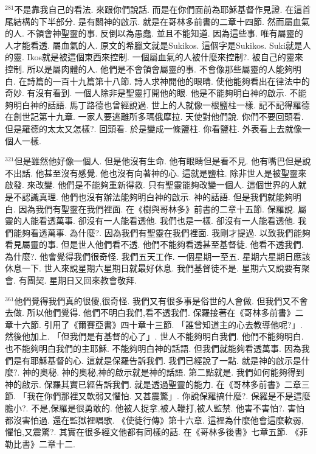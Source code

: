 \documentclass{book}
\begin{document}
$^{281}$不是靠我自己的看法.
來跟你們說話.
而是在你們面前為耶穌基督作見證.
在這首尾結構的下半部分.
是有關神的啟示.
就是在哥林多前書的二章十四節.
然而屬血氣的人.
不領會神聖靈的事.
反倒以為愚蠢.
並且不能知道.
因為這些事.
唯有屬靈的人才能看透.
屬血氣的人.
原文的希臘文就是Sukikos.
這個字是Sukikos.
Suki就是人的靈.
Ikos就是被這個東西來控制.
一個屬血氣的人被什麼來控制?.
被自己的靈來控制.
所以是屬肉體的人.
他們是不會領會屬靈的事.
不會像那些屬靈的人能夠明白.
在詩篇的一百十九篇第十八節.
詩人求神開他的眼睛.
使他能夠看出在律法中的奇妙.
有沒有看到.
一個人除非是聖靈打開他的眼.
他是不能夠明白神的啟示.
不能夠明白神的話語.
馬丁路德也曾經說過.
世上的人就像一根鹽柱一樣.
記不記得羅德在創世記第十九章.
一家人要逃離所多瑪俄摩拉.
天使對他們說.
你們不要回頭看.
但是羅德的太太又怎樣?.
回頭看.
於是變成一條鹽柱.
你看鹽柱.
外表看上去就像一個人一樣.

$^{321}$但是雖然他好像一個人.
但是他沒有生命.
他有眼睛但是看不見.
他有嘴巴但是說不出話.
他甚至沒有感覺.
他也沒有向著神的心.
這就是鹽柱.
除非世人是被聖靈來啟發.
來改變.
他們是不能夠重新得救.
只有聖靈能夠改變一個人.
這個世界的人就是不認識真理.
他們也沒有辦法能夠明白神的啟示.
神的話語.
但是我們就能夠明白.
因為我們有聖靈在我們裡面.
在《樹與哥林多》前書的二章十五節.
保羅說.
屬靈的人能看透萬事.
卻沒有一人能看透他.
我們也是一樣.
卻沒有一人能看透他.
我們能夠看透萬事.
為什麼?.
因為我們有聖靈在我們裡面.
我剛才提過.
以致我們能夠看見屬靈的事.
但是世人他們看不透.
他們不能夠看透甚至基督徒.
他看不透我們.
為什麼?.
他會覺得我們很奇怪.
我們五天工作.
一個星期一至五.
星期六星期日應該休息一下.
世人來說星期六星期日就最好休息.
我們基督徒不是.
星期六又說要有聚會.
有團契.
星期日又回來教會敬拜.

$^{361}$他們覺得我們真的很傻,很奇怪.
我們又有很多事是俗世的人會做.
但我們又不會去做.
所以他們覺得.
他們不明白我們,看不透我們.
保羅接著在《哥林多前書》二章十六節.
引用了《爾賽亞書》四十章十三節.
「誰曾知道主的心去教導他呢?」.
然後他加上.
「但我們是有基督的心了」.
世人不能夠明白我們.
他們不能夠明白.
也不能夠明白我們的主耶穌.
不能夠明白神的話語.
但我們就能夠看透萬事.
因為我們是有耶穌基督的心.
這就是保羅告訴我們.
我們已經說了一點.
就是神的啟示是什麼?.
神的奧秘.
神的奧秘,神的啟示就是神的話語.
第二點就是.
我們如何能夠得到神的啟示.
保羅其實已經告訴我們.
就是透過聖靈的能力.
在《哥林多前書》二章三節.
「我在你們那裡又軟弱又懼怕.
又甚震驚」.
你說保羅搞什麼?.
保羅是不是這麼膽小?.
不是,保羅是很勇敢的.
他被人捉拿,被人鞭打,被人監禁.
他害不害怕?.
害怕都沒害怕過.
還在監獄裡唱歌.
《使徒行傳》第十六章.
這裡為什麼他會這麼軟弱,懼怕,又震驚?.
其實在很多經文他都有同樣的話.
在《哥林多後書》七章五節.
《菲勒比書》二章十二.
\end{document}
